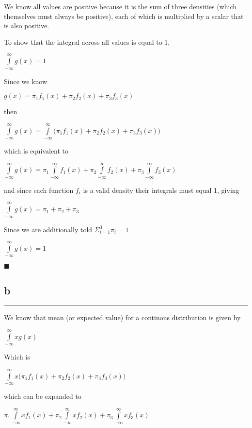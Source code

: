 \documentclass[]{tufte-handout}
\begin{document}
We know all values are positive because it is the sum of three densities
(which themselves must always be positive), each of which is multiplied
by a scalar that is also positive.

To show that the integral across all values is equal to 1,

\(\int\limits_{-\infty}^{\infty}g(x) = 1\)

Since we know

\(g(x) = \pi_1f_1(x) + \pi_2f_2(x) + \pi_3f_3(x)\)

then

\(\int\limits_{-\infty}^{\infty}g(x) = \int\limits_{-\infty}^{\infty}\Big(\pi_1f_1(x) + \pi_2f_2(x) + \pi_3f_3(x)\Big)\)

which is equivalent to

\(\int\limits_{-\infty}^{\infty}g(x) = \pi_1\int\limits_{-\infty}^{\infty}f_1(x) + \pi_2\int\limits_{-\infty}^{\infty}f_2(x)+ \pi_3\int\limits_{-\infty}^{\infty}f_3(x)\)

and since each function \(f_i\) is a valid density their integrals must
equal 1, giving

\(\int\limits_{-\infty}^{\infty}g(x) = \pi_1 + \pi_2 + \pi_3\)

Since we are additionally told \(\Sigma^3_{i=1}\pi_i = 1\)

\(\int\limits_{-\infty}^{\infty}g(x) = 1\)

\begin{marginfigure}
\(\blacksquare\)
\end{marginfigure}

\hypertarget{b}{%
\subsection{b}\label{b}}

\begin{center}\rule{0.5\linewidth}{0.5pt}\end{center}

We know that mean (or expected value) for a continous distribution is
given by

\(\int\limits_{-\infty}^{\infty}xg(x)\)

Which is

\(\int\limits_{-\infty}^{\infty}x\Big(\pi_1f_1(x)+\pi_2f_2(x)+\pi_3f_3(x)\Big)\)

which can be expanded to

\(\pi_1\int\limits_{-\infty}^{\infty}xf_1(x) + \pi_2\int\limits_{-\infty}^{\infty}xf_2(x)+\pi_3\int\limits_{-\infty}^{\infty}xf_3(x)\)
\end{document}
